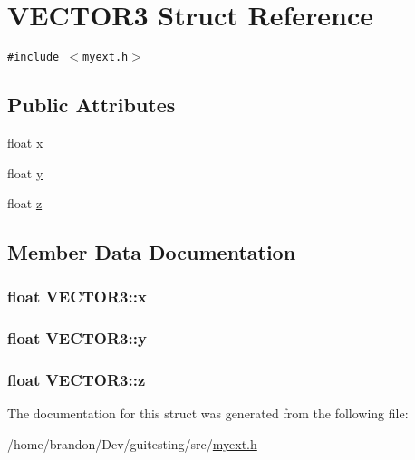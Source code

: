 \hypertarget{struct_v_e_c_t_o_r3}{
\section{VECTOR3 Struct Reference}
\label{struct_v_e_c_t_o_r3}
}
{\tt \#include $<$myext.h$>$}

\subsection*{Public Attributes}
\begin{CompactItemize}
\item 
float \hyperlink{struct_v_e_c_t_o_r3_7bfb16208db9a4400c62edafb28811d8}{x}
\item 
float \hyperlink{struct_v_e_c_t_o_r3_f7864f671d892d707a1ef6d9c04975bb}{y}
\item 
float \hyperlink{struct_v_e_c_t_o_r3_7cf8283bcb19b8ed92cd4c7e589e5ab3}{z}
\end{CompactItemize}


\subsection{Member Data Documentation}
\hypertarget{struct_v_e_c_t_o_r3_7bfb16208db9a4400c62edafb28811d8}{
\subsubsection[{x}]{\setlength{\rightskip}{0pt plus 5cm}float {\bf VECTOR3::x}}}
\label{struct_v_e_c_t_o_r3_7bfb16208db9a4400c62edafb28811d8}


\hypertarget{struct_v_e_c_t_o_r3_f7864f671d892d707a1ef6d9c04975bb}{
\subsubsection[{y}]{\setlength{\rightskip}{0pt plus 5cm}float {\bf VECTOR3::y}}}
\label{struct_v_e_c_t_o_r3_f7864f671d892d707a1ef6d9c04975bb}


\hypertarget{struct_v_e_c_t_o_r3_7cf8283bcb19b8ed92cd4c7e589e5ab3}{
\subsubsection[{z}]{\setlength{\rightskip}{0pt plus 5cm}float {\bf VECTOR3::z}}}
\label{struct_v_e_c_t_o_r3_7cf8283bcb19b8ed92cd4c7e589e5ab3}




The documentation for this struct was generated from the following file:\begin{CompactItemize}
\item 
/home/brandon/Dev/guitesting/src/\hyperlink{myext_8h}{myext.h}\end{CompactItemize}
